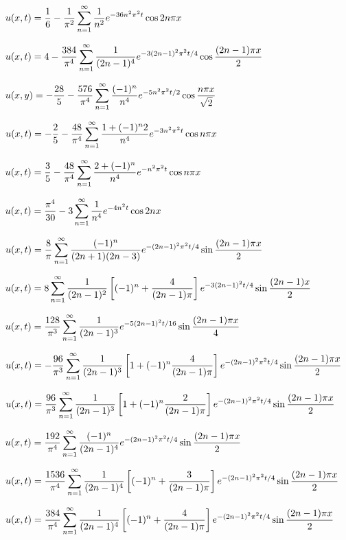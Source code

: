 $u(x,t)=\displaystyle\frac{1}{6}-\frac{1}{\pi^2}\sum_{n=1}^\infty\frac{1}{n^2}e^{-36n^2\pi^2t}\cos 2n\pi x$


$u(x,t)=\displaystyle4-\frac{384}{\pi^4}\sum_{n=1}^\infty\frac{1}{(2n-1)^4}e^{-3(2n-1)^2\pi^2t/4}\cos\frac{(2n-1)\pi x}{2}$

$u(x,y)=\displaystyle-\frac{28}{5}-\frac{576}{\pi^4}\sum_{n=1}^\infty\frac{(-1)^n}{n^4}e^{-5n^2\pi^2t/2}\cos\frac{n\pi x}{\sqrt2}$

$u(x,t)=\displaystyle-\frac{2}{5}-\frac{48}{\pi^4}\sum_{n=1}^\infty\frac{1+(-1)^n2}{n^4}e^{-3n^2\pi^2t}\cos n\pi x$

$u(x,t)=\displaystyle\frac{3}{5}-\frac{48}{\pi^4}\sum_{n=1}^\infty\frac{2+(-1)^n}{n^4}e^{-n^2\pi^2t}\cos n\pi x$

$\displaystyle u(x,t)=\frac{\pi^4}{30}-3\sum_{n=1}^\infty\frac{1}{n^4}e^{-4n^2t}\cos2nx$


$u(x,t)=\displaystyle{\frac{8}{\pi} \sum^\infty_{n=1}
\frac{(-1)^n}{(2n+1)(2n-3)} e^{-(2n-1)^2\pi^2 t/4}\sin\frac{(2n-1)\pi x}{
2}}$


$u(x,t)=\displaystyle8\sum_{n=1}^\infty\frac{1}{(2n-1)^2}\left[
(-1)^n+\frac{4}{(2n-1)\pi}\right]e^{-3(2n-1)^2t/4}\sin\frac{(2n-1) x}{2}$

$u(x,t)=\displaystyle
\frac{128}{\pi^3}\sum_{n=1}^\infty\frac{1}{(2n-1)^3}e^{-5(2n-1)^2t/16}\sin\frac{(2n-1)\pi x}{4}$

$u(x,t)
=\displaystyle-\frac{96}{\pi^3}\sum_{n=1}^\infty
\frac{1}{(2n-1)^3}\left[1+(-1)^n\frac{4}{(2n-1)\pi}\right]
e^{-(2n-1)^2\pi^2t/4}\sin\frac{(2n-1)\pi x}{2}$



$u(x,t)
=\displaystyle\frac{96}{\pi^3}\sum_{n=1}^\infty
\frac{1}{(2n-1)^3}\left[1+(-1)^n\frac{2}{(2n-1)\pi}\right]
e^{-(2n-1)^2\pi^2t/4}\sin\frac{(2n-1)\pi x}{2}$


$u(x,t)=\displaystyle\frac{192}{\pi^4}\sum_{n=1}^\infty\frac{(-1)^n}{(2n-1)^4}
e^{-(2n-1)^2\pi^2t/4}\sin\frac{(2n-1)\pi x}{2}$


$u(x,t)=\displaystyle\frac{1536}{\pi^4}\sum_{n=1}^\infty\frac{1}{(2n-1)^4}
\left[(-1)^n+\frac{3}{(2n-1)\pi}\right]
e^{-(2n-1)^2\pi^2t/4}\sin\frac{(2n-1)\pi x}{2}$



$u(x,t)=\displaystyle\frac{384}{\pi^4}\sum_{n=1}^\infty\frac{1}{(2n-1)^4}
\left[(-1)^n+\frac{4}{(2n-1)\pi}\right]
e^{-(2n-1)^2\pi^2t/4}\sin\frac{(2n-1)\pi x}{2}$



